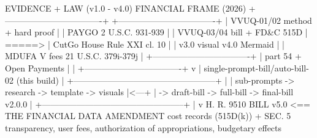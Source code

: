 \documentclass[11pt]{article}
\begin{document}
\begin{asciifig}
EVIDENCE + LAW (v1.0 - v4.0)                  FINANCIAL FRAME (2026)
+----------------------------------+          +----------------------------------+
| VVUQ-01/02  method + hard proof  |          | PAYGO 2 U.S.C. 931-939           |
| VVUQ-03/04  bill + FD&C 515D     |  =====>  | CutGo House Rule XXI cl. 10      |
| v3.0 visual  v4.0 Mermaid        |          | MDUFA V fees 21 U.S.C. 379i-379j |
+----------------------------------+          | part 54 + Open Payments          |
                 |                            +----------------------------------+
                 v                                              |
        single-prompt-bill/auto-bill-02  (this build)           |
        +--------------------------------------------------+    |
        | sub-prompts -> research -> template -> visuals   |<---+
        | -> draft-bill -> full-bill -> final-bill v2.0.0  |
        +--------------------------------------------------+
                                 |
                                 v
        H. R. 9510 BILL v5.0  <== THE FINANCIAL DATA AMENDMENT
        cost records (515D(k)) + SEC. 5 transparency, user fees,
        authorization of appropriations, budgetary effects
\end{asciifig}
\vspace{-0.5cm}

\clearpage
{}

\label{toc:s1}


\end{document}
